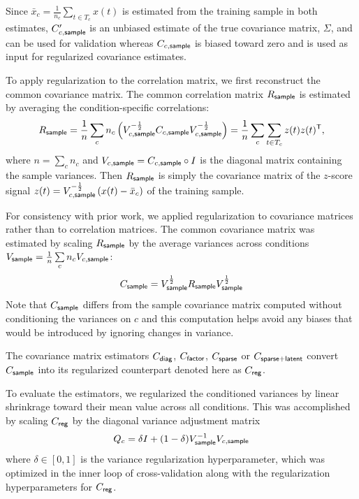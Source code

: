 \documentclass[10pt]{article}
\newcommand{\T}{{\sf T}}
\begin{document}
Since $\bar x_c= \frac 1 {n_c} \sum\limits_{t \in T_c}x(t)$ is estimated from the training sample in both estimates, $C_{c,\sf sample}^\prime$ is an unbiased estimate of the true covariance matrix, $\Sigma$, and can be used for validation whereas $C_{c,\sf sample}$ is biased toward zero and is used as input for regularized covariance estimates.

To apply regularization to the correlation matrix, we first reconstruct the common covariance matrix.
The common correlation matrix $R_{\sf sample}$ is estimated by averaging the condition-specific correlations:
\begin{equation}
	R_{\sf sample}  
	= \frac 1 n \sum\limits_c n_c \left(V_{c,\sf sample}^{-\frac 1 2}C_{c,\sf sample}V_{c,\sf sample}^{-\frac 1 2}\right)
        = \frac 1 n \sum\limits_c \sum\limits_{t \in T_c} z(t)z(t)^\T,
\end{equation}
where $n=\sum\limits_c n_c$ and $V_{c,\sf sample} = C_{c,\sf sample} \circ I$ is the diagonal matrix containing the sample variances. Then $R_{\sf sample}$ is simply the covariance matrix of the $z$-score signal 
$z(t) = V_{c,\sf sample}^{-\frac 1 2} \left(x(t) - \bar x_c\right)$ of the training sample.

For consistency with prior work, we applied regularization to covariance matrices rather than to correlation matrices. The common covariance matrix was estimated by scaling $R_{\sf sample}$ by the average variances across conditions $V_{\sf sample} = \frac 1 n \sum\limits_c n_c V_{c,\sf sample}$:
\begin{equation}
	C_{\sf sample} = V_{\sf sample}^{\frac 1 2} R_{\sf sample} V_{\sf sample}^{\frac 1 2}
\end{equation}
Note that $C_{\sf sample}$ differs from the sample covariance matrix computed without conditioning the variances on $c$ and this computation helps avoid any biases that would be introduced by ignoring changes in variance.

The covariance matrix estimators $C_{\sf diag}$, $C_{\sf factor}$, $C_{\sf sparse}$ or $C_{\sf sparse+latent}$ convert $C_{\sf sample}$ into its regularized counterpart denoted here as $C_{\sf reg}$.

To evaluate the estimators, we regularized the conditioned variances by linear shrinkrage toward their mean value across all conditions. This was accomplished by scaling $C_{\sf reg}$ by the diagonal variance adjustment matrix 
\begin{equation}
	Q_c = \delta I + (1-\delta)V_{\sf sample}^{-1} V_{c,\sf sample}
\end{equation}
where $\delta \in [0,1]$ is the variance regularization hyperparameter, which was optimized in the inner loop of cross-validation along with the regularization hyperparameters for $C_{\sf reg}$.
\end{document}
